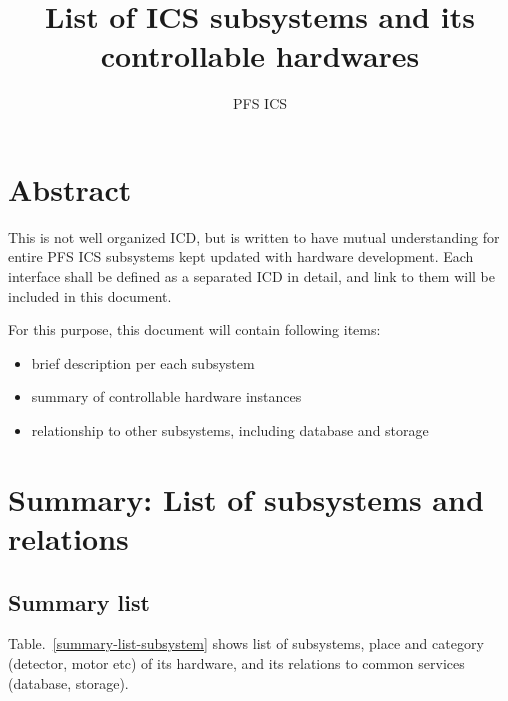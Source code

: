 \documentclass[a4paper,notitlepage]{article}
\title{List of ICS subsystems and its controllable hardwares}
\author{PFS ICS}
\begin{document}
\drafttrue
{}
\SSNChangeRecord{}
\SSNWritten{}

\ssnhead

\section{Abstract}

This is not well organized ICD, but is written to have mutual understanding 
for entire PFS ICS subsystems kept updated with hardware development. 
Each interface shall be defined as a separated ICD in detail, and link to 
them will be included in this document. 

For this purpose, this document will contain following items: 
\begin{itemize}
  \item brief description per each subsystem
  \item summary of controllable hardware instances
  \item relationship to other subsystems, including database and storage
\end{itemize}

\section{Summary: List of subsystems and relations}

\subsection{Summary list}

Table.~\ref{summary-list-subsystem} 
shows list of subsystems, 
place and category (detector, motor etc) of its hardware, 
and its relations to common services (database, storage). 
\end{document}
